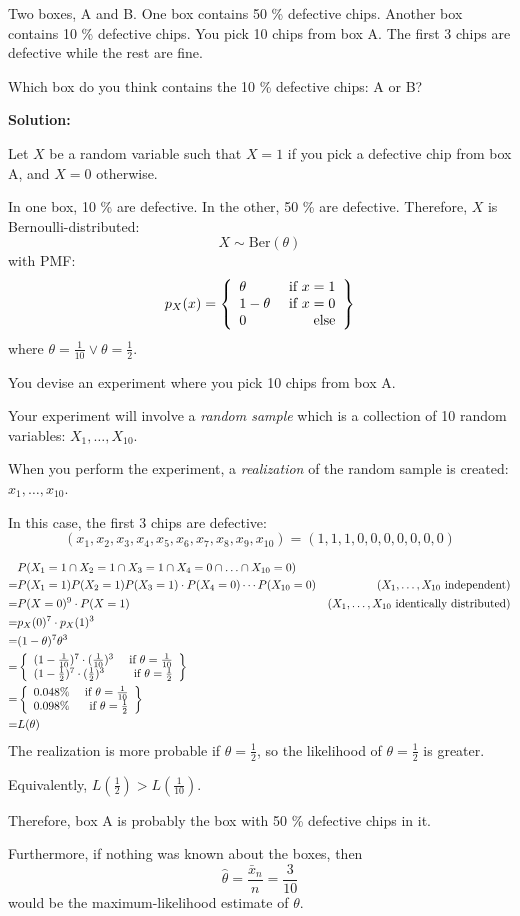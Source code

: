 \documentclass{article}
\begin{document}
\begin{sproblem}
Two boxes, A and B.
One box contains 50 \% defective chips. Another box contains 10 \% defective chips.
You pick 10 chips from box A. The first 3 chips are defective while the rest are fine.

Which box do you think contains the 10 \% defective chips: A or B?
\end{sproblem}

\textbf{Solution:}
\begin{ssolution}

Let \(X\) be a random variable such that \(X=1\) if you pick a defective chip from box A, and \(X=0\) otherwise.

In one box, 10 \% are defective. In the other, 50 \% are defective. Therefore, \(X\) is Bernoulli-distributed:
\[X \sim \text{Ber}(\theta)\]
with PMF:
\[p_X(x) = \left\{\begin{array}{lr}\theta & \text{ if }x=1\\ 1-\theta & \text{ if }x=0 \\0 & \text{ else}\end{array}\right\}\]
where \(\theta=\frac{1}{10} \vee \theta=\frac{1}{2}\).

You devise an experiment where you pick 10 chips from box A.

Your experiment will involve a \textit{random sample} which is a collection of 10 random variables: \(X_1,\ldots,X_{10}\).

When you perform the experiment, a \textit{realization} of the random sample is created: \(x_1, \ldots, x_{10}\).

In this case, the first 3 chips are defective:
\[(x_1,x_2,x_3,x_4,x_5,x_6,x_7,x_8,x_9,x_{10})=(1,1,1,0,0,0,0,0,0,0)\]

\begin{align*}
     & P(X_1=1\cap X_2=1 \cap X_3=1\cap X_4=0 \cap\ldots \cap X_{10}=0) \\
    =& P(X_1=1)P(X_2=1)P(X_3=1)\cdot P(X_4=0) \cdots P(X_{10}=0) & (X_1,\ldots,X_{10}\text{ independent}) \\
    =& P(X=0)^9\cdot P(X=1) & (X_1,\ldots,X_{10}\text{ identically distributed}) \\
    =& p_X(0)^7\cdot p_X(1)^3 \\
    =& (1-\theta)^7\theta^3 \\
    =& \left\{\begin{array}{lr}(1-\frac{1}{10})^7\cdot (\frac{1}{10})^3 & \text{ if }\theta=\frac{1}{10}\\(1-\frac{1}{2})^7\cdot (\frac{1}{2})^3 & \text{ if }\theta=\frac{1}{2}\end{array}\right\} \\
    =& \left\{\begin{array}{lr}0.048 \% & \text{ if }\theta=\frac{1}{10}\\0.098 \% & \text{ if }\theta=\frac{1}{2}\end{array}\right\} \\
    =& L(\theta)
\end{align*}
The realization is more probable if \(\theta=\frac{1}{2}\), so the likelihood of \(\theta=\frac{1}{2}\) is greater.

Equivalently, \(L(\frac{1}{2}) > L(\frac{1}{10})\).

Therefore, box A is probably the box with 50 \% defective chips in it.

Furthermore, if nothing was known about the boxes, then
\[\hat{\theta} = \frac{\bar{x}_n}{n} = \frac{3}{10}\]
would be the maximum-likelihood estimate of \(\theta\).
\end{ssolution}
\end{document}
